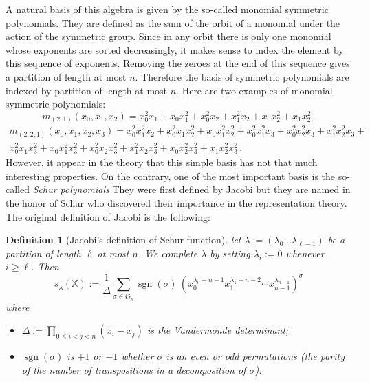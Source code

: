 \documentclass[12pt,a4paper]{article}
\newcommand{\SG}{{\mathfrak S}}
\newcommand{\sgn}{\operatorname{sgn}}
\newcommand{\alphX}{{\mathbb X}}
\newtheorem{DEFN}{Definition}
\begin{document}
A natural basis of this algebra is given by the so-called monomial symmetric
polynomials. They are defined as the sum of the orbit of a monomial under the
action of the symmetric group. Since in any orbit there is only one monomial
whose exponents are sorted decreasingly, it makes sense to index the element
by this sequence of exponents. Removing the zeroes at the end of this sequence
gives a partition of length at most $n$. Therefore the basis of symmetric
polynomials are indexed by partition of length at most $n$. Here are two
examples of monomial symmetric polynomials:
\begin{equation*}
  m_{(2,1)}(x_0,x_1,x_2) =
  x_0^2x_1 + x_0x_1^2 + x_0^2x_2 + x_1^2x_2 + x_0x_2^2 + x_1x_2^2\,.
\end{equation*}
\begin{multline*}
  m_{(2,2,1)}(x_0,x_1,x_2,x_3) =
  x_0^2x_1^2x_2 + x_0^2x_1x_2^2 + x_0x_1^2x_2^2 + x_0^2x_1^2x_3 +
  x_0^2x_2^2x_3 + x_1^2x_2^2x_3 + \\
  x_0^2x_1x_3^2 + x_0x_1^2x_3^2 + x_0^2x_2x_3^2 + x_1^2x_2x_3^2 +
  x_0x_2^2x_3^2 + x_1x_2^2x_3^2\,.
\end{multline*}
However, it appear in the theory that this simple basis has not that much
interesting properties. On the contrary, one of the most important basis is
the so-called \emph{Schur polynomials} They were first defined by Jacobi but
they are named in the honor of Schur who discovered their importance in the
representation theory. The original definition of Jacobi is the following:
\begin{DEFN}[Jacobi's definition of Schur function]
  let $\lambda:=(\lambda_0\dots\lambda_{\ell-1})$ be a partition of length
  $\ell$ at most $n$. We complete $\lambda$ by setting $\lambda_i:=0$ whenever
  $i\geq\ell$. Then
  \begin{equation}
    s_{\lambda} (\alphX) :=
    \frac{1}{\Delta}\sum_{\sigma\in\SG_n}
    \sgn(\sigma)\ 
    (x_0^{\lambda_0 + n-1}x_1^{\lambda_1 + n-2}\cdots x_{n-1}^{\lambda_{n-1}})^\sigma
  \end{equation}
  where
  \begin{itemize}
  \item $\Delta:=\prod_{0\leq i<j<n} (x_i - x_j)$ is the Vandermonde
    determinant;
  \item $\sgn(\sigma)$ is $+1$ or $-1$ whether $\sigma$ is an
    even or odd permutations (the parity of the number of transpositions in a
    decomposition of $\sigma$).
  \end{itemize}
\end{DEFN}
\end{document}
